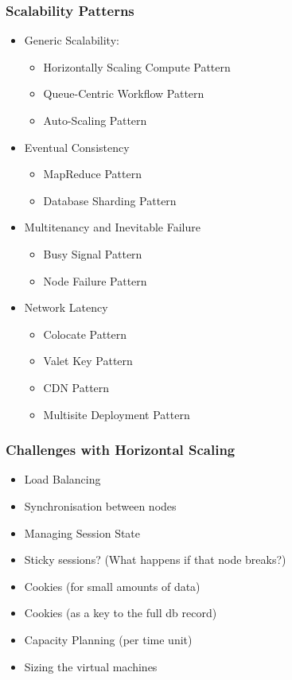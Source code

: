 \documentclass[10pt]{beamer}
\def\subitem{\item[\hspace{1.5cm} -]}
\begin{document}
\begin{frame}[t]
\frametitle{Scalability Patterns}
\begin{itemize}
\item Generic Scalability:
\begin{itemize}
\item Horizontally Scaling Compute Pattern
\item Queue-Centric Workflow Pattern
\item Auto-Scaling Pattern
\end{itemize}
\item Eventual Consistency
\begin{itemize}
\item MapReduce Pattern
\item Database Sharding Pattern
\end{itemize}
\item Multitenancy and Inevitable Failure
\begin{itemize}
\item Busy Signal Pattern
\item Node Failure Pattern
\end{itemize}
\item Network Latency
\begin{itemize}
\item Colocate Pattern
\item Valet Key Pattern
\item CDN Pattern
\item Multisite Deployment Pattern
\end{itemize}
\end{itemize}
\end{frame}


\begin{frame}[t]
\frametitle{Challenges with Horizontal Scaling}
\begin{itemize}
\item Load Balancing
\item Synchronisation between nodes
\item Managing Session State
\subitem Sticky sessions? (What happens if that node breaks?)
\subitem Cookies (for small amounts of data)
\subitem Cookies (as a key to the full db record)
\item Capacity Planning (per time unit)
\item Sizing the virtual machines
\end{itemize}
\end{frame}
\end{document}
